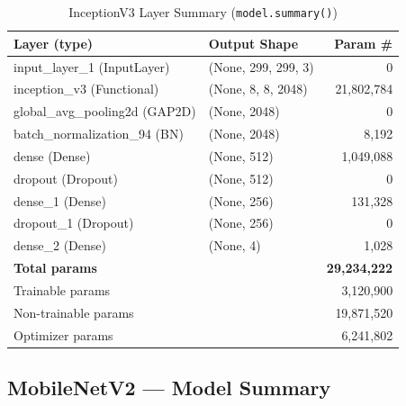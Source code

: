 \documentclass[12pt,a4paper]{article}
\begin{document}
\begin{table}[H]
\centering
\caption{InceptionV3 Layer Summary (\texttt{model.summary()})}
\label{tab:summary_inceptionv3}
\begin{tabular}{l l r}
  \toprule
  \textbf{Layer (type)} & \textbf{Output Shape} & \textbf{Param \#} \\
  \midrule
  input\_layer\_1 (InputLayer)         & (None, 299, 299, 3)  &            0 \\
  inception\_v3 (Functional)           & (None, 8, 8, 2048)   &   21,802,784 \\
  global\_avg\_pooling2d (GAP2D)       & (None, 2048)         &            0 \\
  batch\_normalization\_94 (BN)        & (None, 2048)         &        8,192 \\
  dense (Dense)                        & (None, 512)          &    1,049,088 \\
  dropout (Dropout)                    & (None, 512)          &            0 \\
  dense\_1 (Dense)                     & (None, 256)          &      131,328 \\
  dropout\_1 (Dropout)                 & (None, 256)          &            0 \\
  dense\_2 (Dense)                     & (None, 4)            &        1,028 \\
  \midrule
  \multicolumn{2}{l}{\textbf{Total params}}    & \textbf{29,234,222} \\
  \multicolumn{2}{l}{Trainable params}         &       3,120,900 \\
  \multicolumn{2}{l}{Non-trainable params}     &      19,871,520 \\
  \multicolumn{2}{l}{Optimizer params}         &       6,241,802 \\
  \bottomrule
\end{tabular}
\end{table}

\subsection{MobileNetV2 --- Model Summary}
\end{document}
